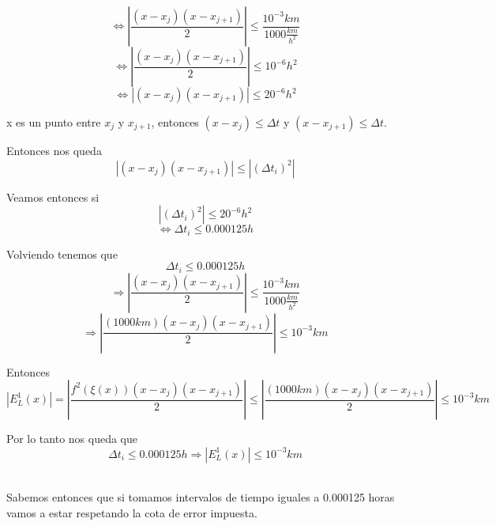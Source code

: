 \documentclass[a4paper,10pt]{article}
\begin{document}
\begin{equation}
	\Leftrightarrow | \frac{(x - x_j)(x - x_{j+1})}{2} | \leq \frac{10^{-3} km}{1000 \frac{km}{h^2}}
\end{equation}
\begin{equation}
	\Leftrightarrow | \frac{(x - x_j)(x - x_{j+1})}{2} | \leq 10^{-6} h^2
\end{equation}
\begin{equation}
	\Leftrightarrow |(x - x_j)(x - x_{j+1}) | \leq 20^{-6} h^2
\end{equation}
\par x es un punto entre $x_j$ y $x_{j+1}$, entonces $(x - x_j) \le \Delta t$ y $(x - x_{j+1}) \le \Delta t$.
\par Entonces nos queda
\begin{equation}
	|(x - x_j)(x - x_{j+1}) | \leq | (\Delta t_i)^2 |
\end{equation}
\par Veamos entonces si
\begin{equation}
	| (\Delta t_i)^2 | \leq 20^{-6} h^2
\end{equation}
\begin{equation}
	\Leftrightarrow  \Delta t_i \leq 0.000125 h
\end{equation}

\par Volviendo tenemos que
\begin{equation}
	\Delta t_i \leq 0.000125 h
\end{equation}
\begin{equation}
	 \Rightarrow | \frac{(x - x_j)(x - x_{j+1})}{2} | \leq \frac{10^{-3} km}{1000 \frac{km}{h^2}}
\end{equation}
\begin{equation}
	 \Rightarrow | \frac{(1000 km)(x - x_j)(x - x_{j+1})}{2} | \leq 10^{-3} km
\end{equation}
\par Entonces
\begin{equation}
	| E_L^1(x) | = | \frac{f^2(\xi(x))(x - x_j)(x - x_{j+1})}{2} | \leq | \frac{(1000 km)(x - x_j)(x - x_{j+1})}{2} | \leq 10^{-3} km
\end{equation}
\par Por lo tanto nos queda que
\begin{equation}
	\Delta t_i \leq 0.000125 h \Rightarrow | E_L^1(x) | \leq 10^{-3} km
\end{equation}
\\
\par Sabemos entonces que si tomamos intervalos de tiempo iguales a 0.000125 horas vamos a estar respetando la cota de error impuesta.
\end{document}
